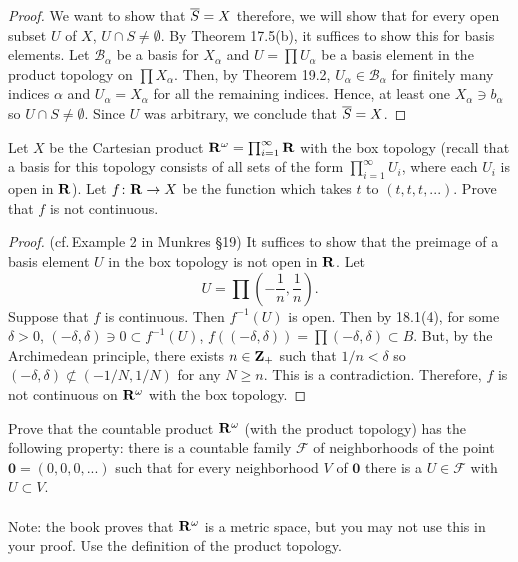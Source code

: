 \begin{proof}
We want to show that $\overline{S}=X$ therefore, we will show that for
every open subset $U$ of $X$, $U\cap S\neq\emptyset$. By Theorem
17.5(b), it suffices to show this for basis elements. Let
$\mathcal{B}_\alpha$ be a basis for $X_\alpha$ and $U=\prod
U_\alpha$ be a basis element in the product topology on $\prod
X_\alpha$. Then, by Theorem 19.2, $U_\alpha\in\mathcal{B}_\alpha$
for finitely many indices $\alpha$ and $U_\alpha=X_\alpha$ for
all the remaining indices. Hence, at least one $X_\alpha\ni
b_\alpha$ so $U\cap S\neq\emptyset$. Since $U$ was arbitrary, we
conclude that $\overline{S}=X$.
\end{proof}
\begin{problem}
Let $X$ be the Cartesian product
$\mathbf{R}^\omega=\prod_{i=1}^\infty\mathbf{R}$ with the box topology (recall
that a basis for this topology consists of all sets of the form
$\prod_{i=1}^\infty U_i$, where each $U_i$ is open in $\mathbf{R}$). Let
$f\colon\mathbf{R}\to X$ be the function which takes $t$ to
$(t,t,t,...)$. Prove that $f$ is not continuous.
\end{problem}
\begin{proof}
(cf.\,Example 2 in Munkres \S19) It suffices to show that the
preimage of a basis element $U$ in the box topology is not open
in $\mathbf{R}$. Let
\[
U=\prod\left(-\frac{1}{n},\frac{1}{n}\right).
\]
Suppose that $f$ is continuous. Then $f^{-1}(U)$ is open. Then by
18.1(4), for some $\delta>0$, $(-\delta,\delta)\ni 0\subset
f^{-1}(U)$, $f((-\delta,\delta))=\prod (-\delta,\delta)\subset
B$. But, by the Archimedean principle, there exists $n\in\mathbf{Z}_+$
such that $1/n<\delta$ so $(-\delta,\delta)\nsubset(-1/N,1/N)$
for any $N\geq n$. This is a contradiction. Therefore, $f$ is not
continuous on $\mathbf{R}^\omega$ with the box topology.
\end{proof}
\begin{problem}
Prove that the countable product $\mathbf{R}^\omega$ (with the product
topology) has the following property: there is a countable family
$\mathcal{F}$ of neighborhoods of the point
$\mathbf{0}=(0,0,0,...)$ such that for every neighborhood $V$ of
$\mathbf{0}$ there is a $U\in\mathcal{F}$ with $U\subset V$.
\\\\
Note: the book proves that $\mathbf{R}^\omega$ is a metric space, but
you may not use this in your proof. Use the definition of the
product topology.
\end{problem}
